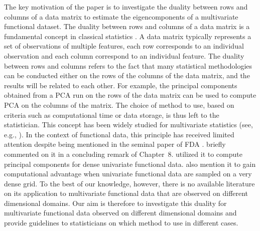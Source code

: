 The key motivation of the paper is to investigate the duality between rows and columns of a data matrix to estimate the eigencomponents of a multivariate functional dataset. The duality between rows and columns of a data matrix is a fundamental concept in classical statistics \citep{escofierTraitementSimultaneVariables1979,saportaSimultaneousAnalysisQualitative1990}. A data matrix typically represents a set of observations of multiple features, each row corresponds to an individual observation and each column correspond to an individual feature. The duality between rows and columns refers to the fact that many statistical methodologies can be conducted either on the rows of the columns of the data matrix, and the results will be related to each other. For example, the principal components obtained from a PCA run on the rows of the data matrix can be used to compute PCA on the columns of the matrix. The choice of method to use, based on criteria such as computational time or data storage, is thus left to the statistician. This concept has been widely studied for multivariate statistics (see, e.g., \cite{pagesMultipleFactorAnalysis2014,hardleAppliedMultivariateStatistical2019}). In the context of functional data, this principle has received limited attention despite being mentioned in the seminal paper of FDA \citep{ramsayWhenDataAre1982a}. \cite{ramsayFunctionalDataAnalysis2005} briefly commented on it in a concluding remark of Chapter~8. \cite{kneipInferenceDensityFamilies2001,benkoCommonFunctionalPrincipal2009} utilized it to compute principal components for dense univariate functional data. \cite{chenQuantifyingInfiniteDimensionalData2017} also mention it to gain computational advantage when univariate functional data are sampled on a very dense grid. To the best of our knowledge, however, there is no available literature on its application to multivariate functional data that are observed on different dimensional domains. Our aim is therefore to investigate this duality for multivariate functional data observed on different dimensional domains and provide guidelines to statisticians on which method to use in different cases.

